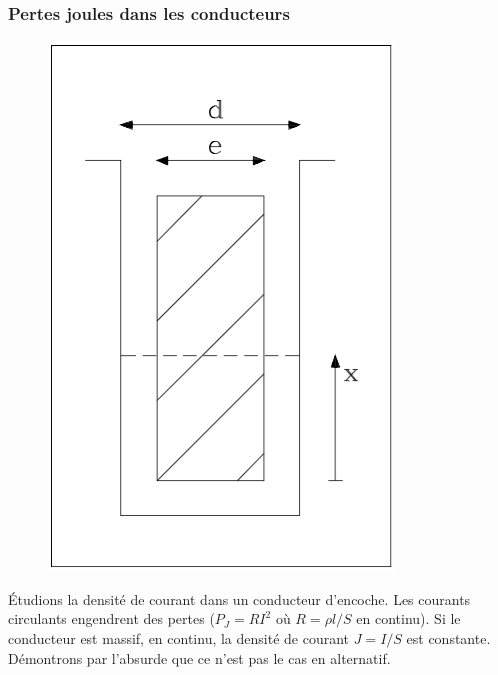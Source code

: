 	\subsubsection{Pertes joules dans les conducteurs}
	\begin{figure}
	\vspace{-5mm}
	\includegraphics[scale=0.4]{ch2/image9} 
	\label{fig:2.9}
	\end{figure}
	Étudions la densité de courant dans un conducteur d'encoche. Les courants 
	circulants engendrent des pertes ($P_J = RI^2$ où $R=\rho l/S$ en continu).
	Si le conducteur est massif, en continu, la densité de courant $J=I/S$ est 
	constante. Démontrons par l'absurde que ce n'est pas le cas en alternatif.\\
	
